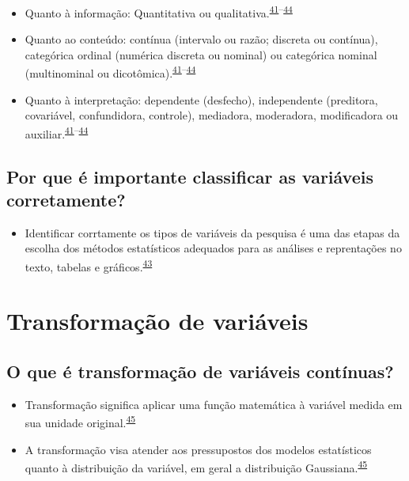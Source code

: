 \documentclass[
]{book}
\providecommand{\tightlist}{%
  \setlength{\itemsep}{0pt}\setlength{\parskip}{0pt}}
\begin{document}
\begin{itemize}
\item
  Quanto à informação: Quantitativa ou qualitativa.\textsuperscript{\protect\hyperlink{ref-Ali2016}{41}--\protect\hyperlink{ref-kaliyadan2019}{44}}
\item
  Quanto ao conteúdo: contínua (intervalo ou razão; discreta ou contínua), categórica ordinal (numérica discreta ou nominal) ou categórica nominal (multinominal ou dicotômica).\textsuperscript{\protect\hyperlink{ref-Ali2016}{41}--\protect\hyperlink{ref-kaliyadan2019}{44}}
\item
  Quanto à interpretação: dependente (desfecho), independente (preditora, covariável, confundidora, controle), mediadora, moderadora, modificadora ou auxiliar.\textsuperscript{\protect\hyperlink{ref-Ali2016}{41}--\protect\hyperlink{ref-kaliyadan2019}{44}}
\end{itemize}

\hypertarget{por-que-uxe9-importante-classificar-as-variuxe1veis-corretamente}{%
\subsection{Por que é importante classificar as variáveis corretamente?}\label{por-que-uxe9-importante-classificar-as-variuxe1veis-corretamente}}

\begin{itemize}
\tightlist
\item
  Identificar corrtamente os tipos de variáveis da pesquisa é uma das etapas da escolha dos métodos estatísticos adequados para as análises e reprentações no texto, tabelas e gráficos.\textsuperscript{\protect\hyperlink{ref-Dettori2018}{43}}
\end{itemize}

\hypertarget{transformacao}{%
\section{Transformação de variáveis}\label{transformacao}}

\hypertarget{o-que-uxe9-transformauxe7uxe3o-de-variuxe1veis-contuxednuas}{%
\subsection{O que é transformação de variáveis contínuas?}\label{o-que-uxe9-transformauxe7uxe3o-de-variuxe1veis-contuxednuas}}

\begin{itemize}
\item
  Transformação significa aplicar uma função matemática à variável medida em sua unidade original.\textsuperscript{\protect\hyperlink{ref-Bland1996}{45}}
\item
  A transformação visa atender aos pressupostos dos modelos estatísticos quanto à distribuição da variável, em geral a distribuição Gaussiana.\textsuperscript{\protect\hyperlink{ref-Bland1996}{45}}
\end{itemize}
\end{document}
